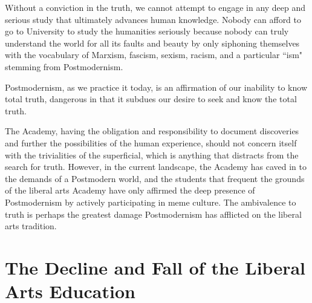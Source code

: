\documentclass[12pt,letterpaper]{article}
\begin{document}
Without a conviction in the truth, we cannot attempt to engage in any deep and serious study that ultimately advances human knowledge.  Nobody can afford to go to University to study the humanities seriously because nobody can truly understand the world for all its faults and beauty by only siphoning themselves with the vocabulary of Marxism, fascism, sexism, racism, and a particular ``ism" stemming from Postmodernism.

Postmodernism, as we practice it today, is an affirmation of our inability to know total truth, dangerous in that it subdues our desire to seek and know the total truth.  


The Academy, having the obligation and responsibility to document discoveries and further the possibilities of the human experience, should not concern itself with the trivialities of the superficial, which is anything that distracts from the search for truth.  However, in the current landscape, the Academy has caved in to the demands of a Postmodern world, and the students that frequent the grounds of the liberal arts Academy have only affirmed the deep presence of Postmodernism by actively participating in meme culture.  The ambivalence to truth is perhaps the greatest damage Postmodernism has afflicted on the liberal arts tradition.

%
%
%



\section{The Decline and Fall of the Liberal Arts Education} 
\end{document}
